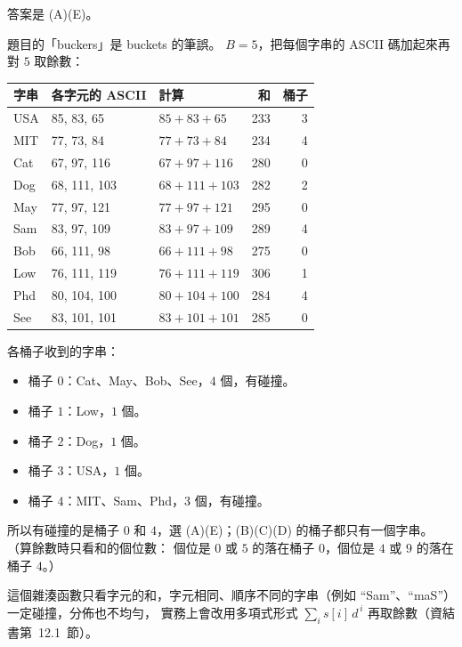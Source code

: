 \begin{pastsoln}
答案是 (A)(E)。

題目的「buckers」是 buckets 的筆誤。 $B = 5$，把每個字串的 ASCII 碼加起來再對 $5$ 取餘數：
\begin{center}
\small
\begin{tabular}{lll r r}
\toprule
字串 & 各字元的 ASCII & 計算 & 和 & 桶子 \\
\midrule
USA & 85, 83, 65 & $85 + 83 + 65$ & 233 & 3 \\
MIT & 77, 73, 84 & $77 + 73 + 84$ & 234 & 4 \\
Cat & 67, 97, 116 & $67 + 97 + 116$ & 280 & 0 \\
Dog & 68, 111, 103 & $68 + 111 + 103$ & 282 & 2 \\
May & 77, 97, 121 & $77 + 97 + 121$ & 295 & 0 \\
Sam & 83, 97, 109 & $83 + 97 + 109$ & 289 & 4 \\
Bob & 66, 111, 98 & $66 + 111 + 98$ & 275 & 0 \\
Low & 76, 111, 119 & $76 + 111 + 119$ & 306 & 1 \\
Phd & 80, 104, 100 & $80 + 104 + 100$ & 284 & 4 \\
See & 83, 101, 101 & $83 + 101 + 101$ & 285 & 0 \\
\bottomrule
\end{tabular}
\end{center}
各桶子收到的字串：
\begin{itemize}
\item 桶子 $0$：Cat、May、Bob、See，$4$ 個，有碰撞。
\item 桶子 $1$：Low，$1$ 個。
\item 桶子 $2$：Dog，$1$ 個。
\item 桶子 $3$：USA，$1$ 個。
\item 桶子 $4$：MIT、Sam、Phd，$3$ 個，有碰撞。
\end{itemize}
所以有碰撞的是桶子 $0$ 和 $4$，選 (A)(E)；(B)(C)(D) 的桶子都只有一個字串。 （算餘數時只看和的個位數：
個位是 $0$ 或 $5$ 的落在桶子 $0$，個位是 $4$ 或 $9$ 的落在桶子 $4$。）

這個雜湊函數只看字元的和，字元相同、順序不同的字串（例如 ``Sam''、``maS''）一定碰撞，分佈也不均勻，
實務上會改用多項式形式 $\sum_i s[i]\, d^{\,i}$ 再取餘數（資結書第~12.1~節）。
\end{pastsoln}
